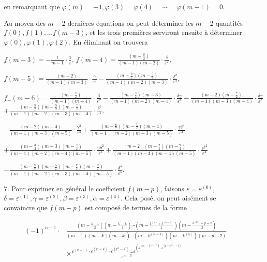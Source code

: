 \documentclass{article}
\begin{document}
en remarquant que \(\varphi(m)=-1, \varphi(3)=\varphi(4)=\cdots=\varphi(m-1)=0\).

Au moyen des \(m-2\) dernières équations on peut déterminer les \(m-2\) quantités \(f(0), f(1), \ldots f(m-3)\), et les trois premières serviront ensuite à déterminer \(\varphi(0), \varphi(1), \varphi(2)\). En éliminant on trouvera

\(f(m-3)=-\frac{1}{m-1} \cdot \frac{1}{\varepsilon}\),
\(f(m-4)=\frac{\left(m-\frac{8}{2}\right)}{(m-1)(m-2)} \cdot \frac{\delta}{\varepsilon^{2}}\),

\(f(m-5)=\frac{(m-2)}{(m-1)(m-3)} \cdot \frac{\gamma}{\varepsilon^{2}}-\frac{\left(m-\frac{9}{2}\right)\left(m-\frac{5}{2}\right)}{(m-1)(m-2)(m-3)} \cdot \frac{\delta^{2}}{\varepsilon^{3}}\),

\(f_{-}(m-6)=\frac{\left(m-\frac{5}{2}\right)}{(m-1)(m-4)} \cdot \frac{\beta}{\varepsilon^{2}}-\frac{\left(m-\frac{3}{2}\right)(m-3)}{(m-1)(m-2)(m-4)} \cdot \frac{\delta \gamma}{\varepsilon^{3}}-\frac{(m-2)\left(m-\frac{7}{2}\right) .}{(m-1)(m-3)(m-4)} \cdot \frac{\delta \gamma}{\varepsilon^{3}}\) \(+\frac{\left(m-\frac{3}{2}\right)\left(m-\frac{5}{2}\right)\left(m-\frac{7}{2}\right)}{(m-1)(m-2)(m-3)(m-4)} \cdot \frac{\delta^{3}}{\varepsilon^{4}}\),


\(-\frac{(m-2)(m-4)}{(m-1)(m-3)(m-5)} \cdot \frac{\gamma^{2}}{\varepsilon^{3}}+\frac{\left(m-\frac{8}{2}\right)\left(m-\frac{5}{2}\right)(m-4)}{(m-1)(m-2)(m-3)(m-5)} \cdot \frac{\gamma \delta^{2}}{\varepsilon^{4}}\)

\(+\frac{\left(m-\frac{3}{2}\right)(m-3)\left(m-\frac{9}{2}\right)}{(m-1)(m-2)(m-4)(m-5)} \cdot \frac{\gamma \delta^{2}}{\varepsilon^{4}}+\frac{(m-2)\left(m-\frac{7}{2}\right)\left(m-\frac{9}{2}\right)}{(m-1)(m-3)(m-4)(m-5)} \cdot \frac{\gamma \delta^{2}}{\varepsilon^{4}}\)

\(-\frac{\left(m-\frac{8}{8}\right)\left(m-\frac{5}{2}\right)\left(m-\frac{7}{2}\right)\left(m-\frac{9}{2}\right)}{(m-1)(m-2)(m-3)(m-4)(m-5)} \cdot \frac{\delta^{4}}{\varepsilon^{5}}\).

7. Pour exprimer en général le coefficient \(f(m-p)\), faisons \(\varepsilon=\varepsilon^{(0)}\), \(\delta=\varepsilon^{(1)}, \gamma=\varepsilon^{(2)}, \beta=\varepsilon^{(3)}, \alpha=\varepsilon^{(4)}\). Cela posé, on peut aisément se convaincre que \(f(m-p)\) est composé de termes de la forme

\[
\begin{aligned}
(-1)^{n+1} \cdot & \frac{\left(m-\frac{k+1}{2}\right)\left(m-\frac{k^{\prime}+k}{2}\right) \cdots\left(m-\frac{k^{(n)}+k^{(n-1)}}{2}\right)\left(m-\frac{k^{(n)}+p-2}{2}\right)}{(m-1)(m-k)\left(m-k^{\prime}\right) \cdots\left(m-k^{(n-1)}\right)\left(m-k^{(n)}\right)(m-p+2)} \\
& \times \frac{\varepsilon^{(k-1)} \cdot \varepsilon^{\left(k^{\prime}-k\right)} \cdot \varepsilon^{\left(k^{n}-k^{\prime}\right)} \ldots \varepsilon^{\left(k^{\left.(n)-k^{(n-1)}\right)} \cdot \varepsilon^{\left(p-k^{(n)}-2\right)}\right.}}{\varepsilon^{n+3}}
\end{aligned}
\]
\end{document}
